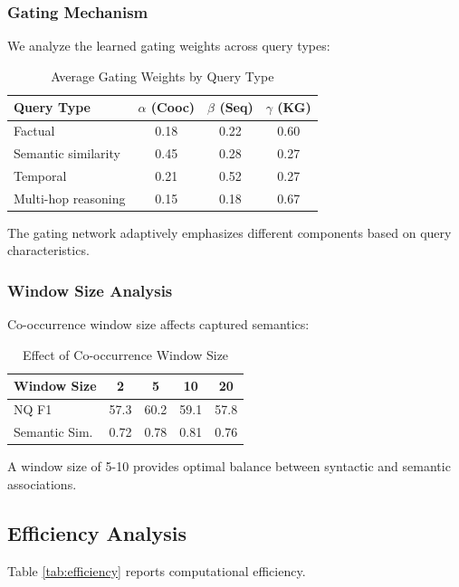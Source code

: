 \documentclass[conference]{IEEEtran}
\begin{document}
\subsubsection{Gating Mechanism}

We analyze the learned gating weights across query types:

\begin{table}[h]
\centering
\caption{Average Gating Weights by Query Type}
\label{tab:gating}
\begin{tabular}{lccc}
\toprule
\textbf{Query Type} & $\alpha$ (Cooc) & $\beta$ (Seq) & $\gamma$ (KG) \\
\midrule
Factual & 0.18 & 0.22 & 0.60 \\
Semantic similarity & 0.45 & 0.28 & 0.27 \\
Temporal & 0.21 & 0.52 & 0.27 \\
Multi-hop reasoning & 0.15 & 0.18 & 0.67 \\
\bottomrule
\end{tabular}
\end{table}

The gating network adaptively emphasizes different components based on query characteristics.

\subsubsection{Window Size Analysis}

Co-occurrence window size affects captured semantics:

\begin{table}[h]
\centering
\caption{Effect of Co-occurrence Window Size}
\label{tab:window}
\begin{tabular}{lcccc}
\toprule
\textbf{Window Size} & 2 & 5 & 10 & 20 \\
\midrule
NQ F1 & 57.3 & 60.2 & 59.1 & 57.8 \\
Semantic Sim. & 0.72 & 0.78 & 0.81 & 0.76 \\
\bottomrule
\end{tabular}
\end{table}

A window size of 5-10 provides optimal balance between syntactic and semantic associations.

\subsection{Efficiency Analysis}

Table \ref{tab:efficiency} reports computational efficiency.
\end{document}
